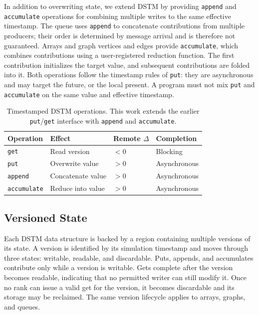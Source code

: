 In addition to overwriting state, we extend DSTM by providing \texttt{append} and
\texttt{accumulate} operations for combining multiple writes to the same
effective timestamp. The queue uses \texttt{append} to concatenate
contributions from multiple producers; their order is determined by message
arrival and is therefore not guaranteed. Arrays and graph vertices and edges
provide \texttt{accumulate}, which combines contributions using a
user-registered reduction function. The first contribution initializes the
target value, and subsequent contributions are folded into it. Both operations
follow the timestamp rules of \texttt{put}: they are asynchronous and may
target the future, or the local present. A program must not mix
\texttt{put} and \texttt{accumulate} on the same value and effective
timestamp.

\begin{table}[t]
\centering
\caption{Timestamped DSTM operations. This work extends the earlier
\texttt{put}/\texttt{get} interface with \texttt{append} and
\texttt{accumulate}.}
\label{tab:timestamped-operations}
\begin{tabular}{llll}
\toprule
Operation & Effect & Remote $\Delta$ & Completion \\
\midrule
\texttt{get}        & Read version          & $<0$ & Blocking \\
\texttt{put}        & Overwrite value       & $>0$ & Asynchronous \\
\texttt{append}     & Concatenate value     & $>0$ & Asynchronous \\
\texttt{accumulate} & Reduce into value     & $>0$ & Asynchronous \\
\bottomrule
\end{tabular}
\end{table}

\subsection{Versioned State}
\label{ref:versions}
Each DSTM data structure is backed by a region containing multiple
versions of its state. A version is identified by its simulation
timestamp and moves through three states: writable, readable, and
discardable. Puts, appends, and accumulates contribute only while a version is
writable. Gets complete after the version becomes readable, indicating
that no permitted writer can still modify it. Once no rank can issue a
valid get for the version, it becomes discardable and its storage may
be reclaimed. The same version lifecycle applies to arrays, graphs, and
queues.

